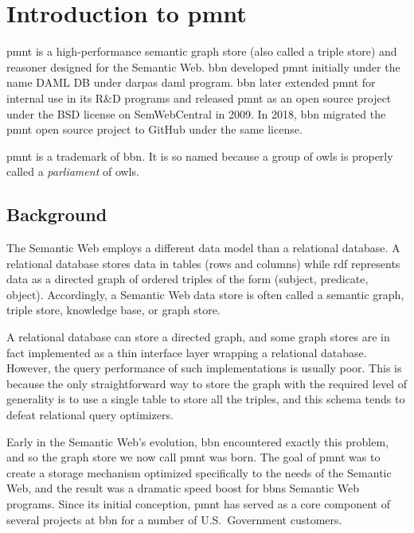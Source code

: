 
\chapter{Introduction to \acl{pmnt}}

\acl{pmnt} is a high-performance semantic graph store (also called a triple store) and reasoner designed for the Semantic Web.  \acf{bbn} developed \ac{pmnt} initially under the name DAML DB under \acp{darpa} \ac{daml} program. \ac{bbn} later extended \ac{pmnt} for internal use in its R\&D programs and released \ac{pmnt} as an open source project under the BSD license on SemWebCentral in 2009.  In 2018, \ac{bbn} migrated the \ac{pmnt} open source project to GitHub under the same license.

\acl{pmnt} is a trademark of \acl{bbn}.  It is so named because a group of owls is properly called a \emph{parliament} of owls.

\section{Background}

The Semantic Web employs a different data model than a relational database.  A relational database stores data in tables (rows and columns) while \ac{rdf} represents data as a directed graph of ordered triples of the form (subject, predicate, object).  Accordingly, a Semantic Web data store is often called a semantic graph, triple store, knowledge base, or graph store.

A relational database can store a directed graph, and some graph stores are in fact implemented as a thin interface layer wrapping a relational database.  However, the query performance of such implementations is usually poor.  This is because the only straightforward way to store the graph with the required level of generality is to use a single table to store all the triples, and this schema tends to defeat relational query optimizers.

Early in the Semantic Web's evolution, \ac{bbn} encountered exactly this problem, and so the graph store we now call \ac{pmnt} was born.  The goal of \ac{pmnt} was to create a storage mechanism optimized specifically to the needs of the Semantic Web, and the result was a dramatic speed boost for \acp{bbn} Semantic Web programs.  Since its initial conception, \ac{pmnt} has served as a core component of several projects at \ac{bbn} for a number of U.S.\ Government customers.

